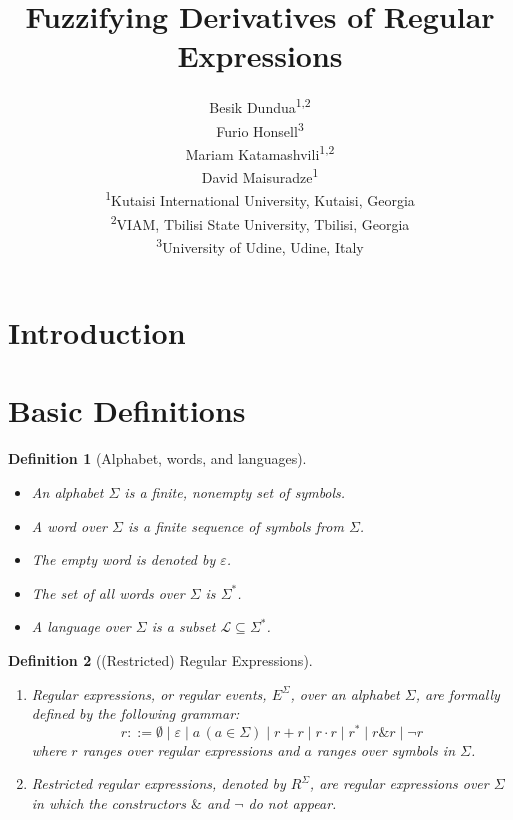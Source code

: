 \documentclass{article}
\title{Fuzzifying Derivatives of Regular Expressions}
\author{
Besik Dundua\textsuperscript{1,2}\\
Furio Honsell\textsuperscript{3}\\
Mariam Katamashvili\textsuperscript{1,2}\\
David Maisuradze\textsuperscript{1}\\[0.75em]
\small \textsuperscript{1}Kutaisi International University, Kutaisi, Georgia\\
\small \textsuperscript{2}VIAM, Tbilisi State University, Tbilisi, Georgia\\
\small \textsuperscript{3}University of Udine, Udine, Italy
}
\date{}
\newtheorem{definition}{Definition}[section]
\begin{document}
\maketitle
\section{Introduction}

\section{Basic Definitions}
\begin{definition}[Alphabet, words, and languages]
\mbox{}\\[-0.5em]
\begin{itemize}
    \item An \emph{alphabet} $\Sigma$ is a finite, nonempty set of symbols.
    \item A \emph{word} over $\Sigma$ is a finite sequence of symbols from $\Sigma$.
    \item The \emph{empty word} is denoted by $\varepsilon$.
    \item The \emph{set of all words} over $\Sigma$ is $\Sigma^*$.
    \item A \emph{language} over $\Sigma$ is a subset $\mathcal{L} \subseteq \Sigma^*$.
\end{itemize}
\end{definition}

\begin{definition}[(Restricted) Regular Expressions]
\hfill 
\begin{enumerate}
\item {\em Regular expressions}, or {\em regular events}, $E^\Sigma$, over an alphabet $\Sigma$, are formally defined by the following grammar:
$$
r ::= \emptyset \mid \varepsilon \mid a\,(a \in \Sigma) \mid r+r \mid r\cdot r \mid r^* \mid r \& r \mid \neg r 
$$
where $r$ ranges over regular expressions and $a$ ranges over symbols in $\Sigma$.
\item \emph{Restricted regular expressions}, denoted by $R^\Sigma$, are regular expressions over $\Sigma$ in which the constructors $\&$ and $\neg$ do not appear.
\end{enumerate}
\end{definition}
\end{document}
